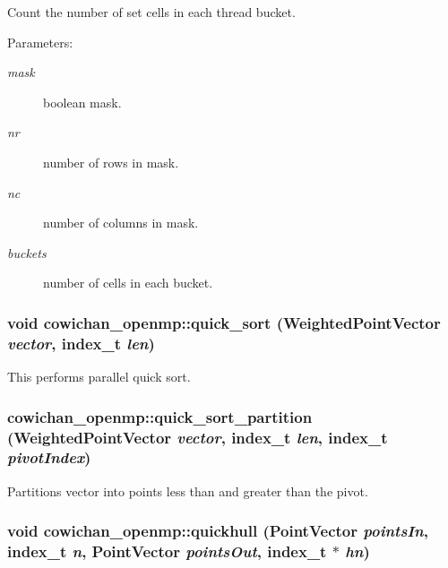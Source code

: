 Count the number of set cells in each thread bucket. \begin{Desc}
\item[Parameters:]
\begin{description}
\item[{\em mask}]boolean mask. \item[{\em nr}]number of rows in mask. \item[{\em nc}]number of columns in mask. \item[{\em buckets}]number of cells in each bucket. \end{description}
\end{Desc}
\hypertarget{namespacecowichan__openmp_64208258cab6e46db879b46b40581134}{
\subsubsection[{quick\_\-sort}]{\setlength{\rightskip}{0pt plus 5cm}void cowichan\_\-openmp::quick\_\-sort ({\bf WeightedPointVector} {\em vector}, \/  {\bf index\_\-t} {\em len})}}
\label{namespacecowichan__openmp_64208258cab6e46db879b46b40581134}


This performs parallel quick sort. \hypertarget{namespacecowichan__openmp_2733c307de545e237e020a1f166850c5}{
\subsubsection[{quick\_\-sort\_\-partition}]{ cowichan\_\-openmp::quick\_\-sort\_\-partition ({\bf WeightedPointVector} {\em vector}, \/  {\bf index\_\-t} {\em len}, \/  {\bf index\_\-t} {\em pivotIndex})}}
\label{namespacecowichan__openmp_2733c307de545e237e020a1f166850c5}


Partitions vector into points less than and greater than the pivot. \hypertarget{namespacecowichan__openmp_f261011870b201d556308f43b5b25b89}{
\subsubsection[{quickhull}]{\setlength{\rightskip}{0pt plus 5cm}void cowichan\_\-openmp::quickhull ({\bf PointVector} {\em pointsIn}, \/  {\bf index\_\-t} {\em n}, \/  {\bf PointVector} {\em pointsOut}, \/  {\bf index\_\-t} $\ast$ {\em hn})}}
\label{namespacecowichan__openmp_f261011870b201d556308f43b5b25b89}


